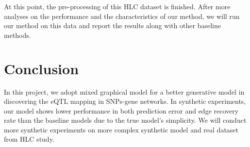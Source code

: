 \documentclass{article}
\begin{document}
At this point, the pre-processing of this HLC dataset is finished. After more analyses on the performance and the characteristics of our method, we will run our method on this data and report the results along with other baseline methods.

\section{Conclusion}
In this project, we adopt mixed graphical model for a better generative model in discovering the eQTL mapping in SNPs-gene networks. In synthetic experiments, our model shows lower performance in both prediction error and edge recovery rate than the baseline models due to the true model's simplicity. We will conduct more synthetic experiments on more complex synthetic model and real dataset from HLC study.
\end{document}
